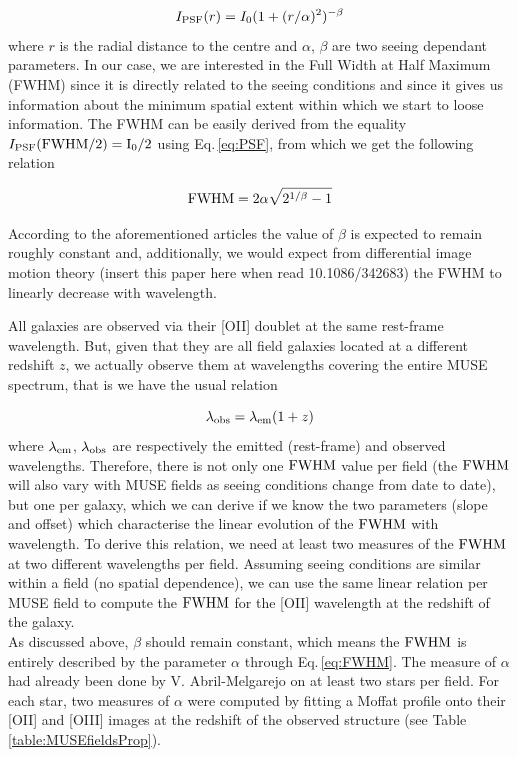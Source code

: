 \begin{equation}
	I_{\rm{PSF}}(r) = I_0 (1 + (r/\alpha)^2 ) ^{- \beta}
	\label{eq:PSF}
\end{equation}
where $r$ is the radial distance to the centre and $\alpha$, $\beta$ are two seeing dependant parameters. In our case, we are interested in the Full Width at Half Maximum (FWHM) since it is directly related to the seeing conditions and since it gives us information about the minimum spatial extent within which we start to loose information.
The FWHM can be easily derived from the equality $I_{\rm{PSF}} ( \rm{FWHM}/2) = I_0 /2$ using Eq.\,\ref{eq:PSF}, from which we get the following relation

\begin{equation}
	\rm{FWHM} = 2 \alpha \sqrt{2^{1/\beta} - 1 }
	\label{eq:FWHM}
\end{equation}

According to the aforementioned articles the value of $\beta$ is expected to remain roughly constant and, additionally, we would expect from differential image motion theory (insert this paper here when read 10.1086/342683) the FWHM to linearly decrease with wavelength. 

All galaxies are observed via their [OII] doublet at the same rest-frame wavelength. But, given that they are all field galaxies located at a different redshift $z$, we actually observe them at wavelengths covering the entire MUSE spectrum, that is we have the usual relation

\begin{equation}
	\lambda_{\rm{obs}} = \lambda_{\rm{em}} ( 1 + z )
\end{equation}
where $\lambda_{\rm{em}}$, $\lambda_{\rm{obs}}$ are respectively the emitted (rest-frame) and observed wavelengths. Therefore, there is not only one $\rm{FWHM}$ value per field (the $\rm{FWHM}$ will also vary with MUSE fields as seeing conditions change from date to date), but one per galaxy, which we can derive if we know the two parameters (slope and offset) which characterise the linear evolution of the $\rm{FWHM}$ with wavelength. To derive this relation, we need at least two measures of the $\rm{FWHM}$ at two different wavelengths per field. Assuming seeing conditions are similar within a field (no spatial dependence), we can use the same linear relation per MUSE field to compute the $\rm{FWHM}$ for the [OII] wavelength at the redshift of the galaxy. \\

As discussed above, $\beta$ should remain constant, which means the $\rm{FWHM}$ is entirely described by the parameter $\alpha$ through Eq.\,\ref{eq:FWHM}. The measure of $\alpha$ had already been done by V. Abril-Melgarejo on at least two stars per field. For each star, two measures of $\alpha$ were computed by fitting a Moffat profile onto their [OII] and [OIII] images at the redshift of the observed structure (see Table \ref{table:MUSEfieldsProp}).


